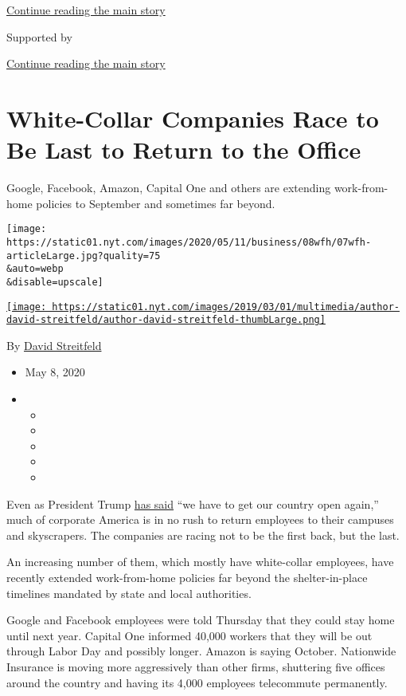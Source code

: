 \protect\hyperlink{after-top}{Continue reading the main story}

Supported by

\protect\hyperlink{after-sponsor}{Continue reading the main story}

\hypertarget{white-collar-companies-race-to-be-last-to-return-to-the-office}{%
\section{White-Collar Companies Race to Be Last to Return to the
Office}\label{white-collar-companies-race-to-be-last-to-return-to-the-office}}

Google, Facebook, Amazon, Capital One and others are extending
work-from-home policies to September and sometimes far beyond.

\texttt{[image: https://static01.nyt.com/images/2020/05/11/business/08wfh/07wfh-articleLarge.jpg?quality=75\\\&auto=webp\\\&disable=upscale]}

\href{https://www.nytimes.com/by/david-streitfeld}{\texttt{[image: https://static01.nyt.com/images/2019/03/01/multimedia/author-david-streitfeld/author-david-streitfeld-thumbLarge.png]}}

By \href{https://www.nytimes.com/by/david-streitfeld}{David Streitfeld}

\begin{itemize}
\item
  May 8, 2020
\item
  \begin{itemize}
  \item
  \item
  \item
  \item
  \item
  \end{itemize}
\end{itemize}

Even as President Trump
\href{https://www.nytimes.com/2020/05/06/us/politics/trump-coronavirus-recovery.html}{has
said} ``we have to get our country open again,'' much of corporate
America is in no rush to return employees to their campuses and
skyscrapers. The companies are racing not to be the first back, but the
last.

An increasing number of them, which mostly have white-collar employees,
have recently extended work-from-home policies far beyond the
shelter-in-place timelines mandated by state and local authorities.

Google and Facebook employees were told Thursday that they could stay
home until next year. Capital One informed 40,000 workers that they will
be out through Labor Day and possibly longer. Amazon is saying October.
Nationwide Insurance is moving more aggressively than other firms,
shuttering five offices around the country and having its 4,000
employees telecommute permanently.

